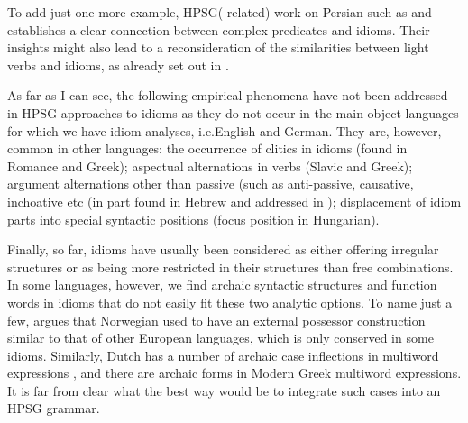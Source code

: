 \documentclass[output=paper]{langsci/langscibook}
\begin{document}
To add just one more example, HPSG(-related) work on Persian such as \cite{MuellerPersian-unlinked} and \cite{Samvelian:Faghiri:16} establishes a clear connection between complex predicates and idioms. 
Their insights might also lead to a reconsideration of the similarities between light verbs and idioms, as already set out in \cite{KE94a}.





As far as I can see, the following empirical phenomena have not been addressed in HPSG-approaches to idioms as they do not occur in the main object languages for which we have idiom analyses, i.e.\@ English and German. They are, however, common in other languages: the occurrence of clitics in idioms (found in Romance and Greek); aspectual alternations in verbs (Slavic and Greek); argument alternations other than passive (such as anti-passive, causative, inchoative etc
(in part found in Hebrew and addressed in \cite{Sheinfux:al:18}); 
displacement of idiom parts into special syntactic positions (focus position in Hungarian). 

Finally, so far, idioms have usually been considered as either offering irregular structures or as being more restricted in their structures than free combinations. In some languages, however, we find archaic syntactic structures and function words in idioms that do not easily fit these two analytic options. To name just a few, \cite{Lodrup:09} argues that Norwegian used to have an external possessor construction similar to that of other European languages, which is only conserved in some idioms. Similarly, Dutch has a number of archaic case inflections in multiword expressions \citep[]{Kuiper:18}, and there are archaic forms in Modern Greek multiword expressions. It is far from clear what the best way would be to integrate such cases into an HPSG grammar. 


\end{document}
